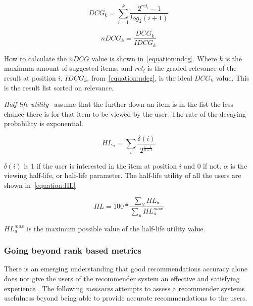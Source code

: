 \begin{equation}
    DCG_k = \sum_{i=1}^{k}{\frac{2^{rel_i}-1}{log_2(i+1)}}
    \label{equation:dcg}
\end{equation}

\begin{equation}
    nDCG_k = \frac{DCG_k}{IDCG_k}
    \label{equation:ndcg}
\end{equation}

How to calculate the $nDCG$ value is shown in~\ref{equation:ndcg}.  Where $k$
is the maximum amount of suggested items, and $rel_i$ is the graded relevance
of the result at position $i$.  $IDCG_k$, from~\ref{equation:ndcg}, is the
ideal $DCG_k$ value.  This is the result list sorted on relevance.

\textit{Half-life utility}~\cite{Breese:1998:EAP:2074094.2074100} assume that
the further down an item is in the list the less chance there is for that item
to be viewed by the user.  The rate of the decaying probability is exponential.

\begin{equation}
	HL_u = \sum_{i}{\frac{\delta(i)}{2^{\frac{i-1}{\alpha-1}}}}
\end{equation}

$\delta(i)$ is 1 if the user is interested in the item at position $i$ and 0 if
not.  $\alpha$ is the viewing half-life, or half-life parameter.  The half-life
utility of all the users are shown in~\ref{equation:HL}

\begin{equation}
	HL = 100 * \frac{\sum_u{HL_u}}{\sum_u{HL_u^{max}}}
	\label{equation:HL}
\end{equation}

$HL_u^{max}$ is the maximum possible value of the half-life utility value.


\subsubsection{Going beyond rank based metrics}

There is an emerging understanding that good recommendations accuracy alone
does not give the users of the recommender system an effective and satisfying
experience \cite{Herlocker2004}. The following \emph{measures} attempts to
assess a recommender systems usefulness beyond being able to provide accurate
recommendations to the users.


